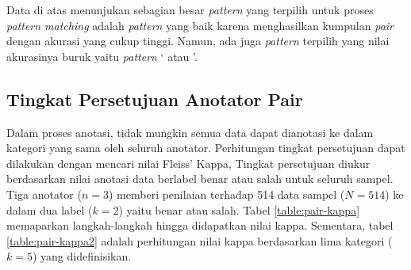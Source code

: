 \begin{table}
  \centering
  \caption{Akurasi \textit{pair} berdasarkan \textit{pattern}}
  \label{table:akurasi-pair-patt}
\end{table}

Data di atas menunjukan sebagian besar \textit{pattern} yang terpilih untuk proses \textit{pattern matching} adalah \textit{pattern} yang baik karena menghasilkan kumpulan \textit{pair} dengan akurasi yang cukup tinggi. Namun, ada juga \textit{pattern} terpilih yang nilai akurasinya buruk yaitu \textit{pattern} `{\tagHypernym} atau {\tagHyponym}'.

\subsection{Tingkat Persetujuan Anotator Pair}
Dalam proses anotasi, tidak mungkin semua data dapat dianotasi ke dalam kategori yang sama oleh seluruh anotator. Perhitungan tingkat persetujuan dapat dilakukan dengan mencari nilai Fleiss' Kappa, Tingkat persetujuan diukur berdasarkan nilai anotasi data berlabel benar atau salah untuk seluruh sampel. Tiga anotator ($n=3$) memberi penilaian terhadap 514 data sampel ($N=514$) ke dalam dua label ($k=2$) yaitu benar atau salah. Tabel \ref{table:pair-kappa} memaparkan langkah-langkah hingga didapatkan nilai kappa. Sementara, tabel \ref{table:pair-kappa2} adalah perhitungan nilai kappa berdasarkan lima kategori ($k=5$) yang didefinisikan.

